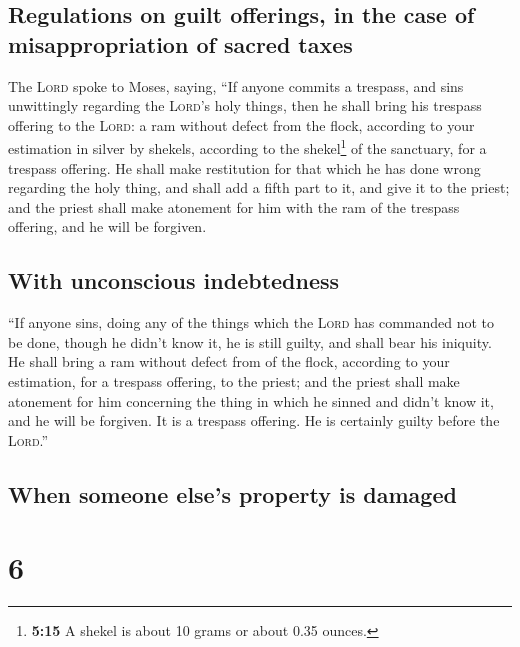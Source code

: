 \hypertarget{regulations-on-guilt-offerings-in-the-case-of-misappropriation-of-sacred-taxes}{%
\subsection{Regulations on guilt offerings, in the case of
misappropriation of sacred
taxes}\label{regulations-on-guilt-offerings-in-the-case-of-misappropriation-of-sacred-taxes}}

 The \textsc{Lord} spoke to Moses, saying,
 ``If anyone commits a trespass, and sins unwittingly
regarding the \textsc{Lord}'s holy things, then he shall bring his
trespass offering to the \textsc{Lord}: a ram without defect from the
flock, according to your estimation in silver by shekels, according to
the shekel\footnote{\textbf{5:15} A shekel is about 10 grams or about
  0.35 ounces.} of the sanctuary, for a trespass offering.
 He shall make restitution for that which he has done
wrong regarding the holy thing, and shall add a fifth part to it, and
give it to the priest; and the priest shall make atonement for him with
the ram of the trespass offering, and he will be forgiven.

\hypertarget{with-unconscious-indebtedness}{%
\subsection{With unconscious
indebtedness}\label{with-unconscious-indebtedness}}

 ``If anyone sins, doing any of the things which the
\textsc{Lord} has commanded not to be done, though he didn't know it, he
is still guilty, and shall bear his iniquity.  He shall
bring a ram without defect from of the flock, according to your
estimation, for a trespass offering, to the priest; and the priest shall
make atonement for him concerning the thing in which he sinned and
didn't know it, and he will be forgiven.  It is a
trespass offering. He is certainly guilty before the \textsc{Lord}.''

\hypertarget{when-someone-elses-property-is-damaged}{%
\subsection{When someone else's property is
damaged}\label{when-someone-elses-property-is-damaged}}

\hypertarget{section-5}{%
\section{6}\label{section-5}}

